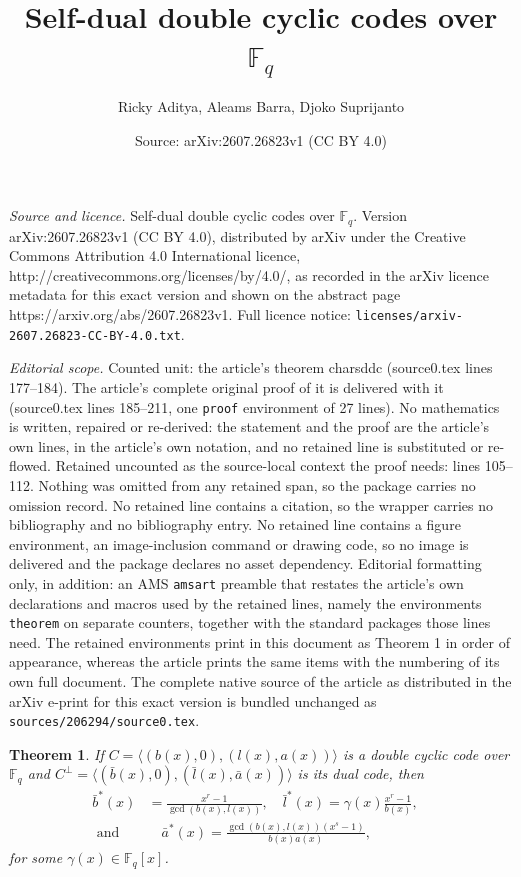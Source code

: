 \documentclass[10pt,a4paper]{amsart}
\title{Self-dual double cyclic codes over $\mathbb{F}_q$}
\author{Ricky Aditya, Aleams Barra, Djoko Suprijanto}
\date{Source: arXiv:2607.26823v1 (CC BY 4.0)}
\newtheorem{theorem}{Theorem}
\begin{document}
\maketitle

\noindent\emph{Source and licence.} Self-dual double cyclic codes over $\mathbb{F}_q$. Version arXiv:2607.26823v1 (CC BY 4.0), distributed by arXiv under the Creative Commons Attribution 4.0 International licence, http://creativecommons.org/licenses/by/4.0/, as recorded in the arXiv licence metadata for this exact version and shown on the abstract page https://arxiv.org/abs/2607.26823v1. Full licence notice: \texttt{licenses/arxiv-2607.26823-CC-BY-4.0.txt}.\par\smallskip

\noindent\textit{Editorial scope.} Counted unit: the article's theorem charsddc (source0.tex lines 177--184). The article's complete original proof of it is delivered with it (source0.tex lines 185--211, one \texttt{proof} environment of 27 lines). No mathematics is written, repaired or re-derived: the statement and the proof are the article's own lines, in the article's own notation, and no retained line is substituted or re-flowed.  Retained uncounted as the source-local context the proof needs: lines 105--112.  Nothing was omitted from any retained span, so the package carries no omission record.  No retained line contains a citation, so the wrapper carries no bibliography and no bibliography entry.  No retained line contains a figure environment, an image-inclusion command or drawing code, so no image is delivered and the package declares no asset dependency.  Editorial formatting only, in addition: an AMS \texttt{amsart} preamble that restates the article's own declarations and macros used by the retained lines, namely the environments \texttt{theorem} on separate counters, together with the standard packages those lines need.  The retained environments print in this document as Theorem 1 in order of appearance, whereas the article prints the same items with the numbering of its own full document.  The complete native source of the article as distributed in the arXiv e-print for this exact version is bundled unchanged as \texttt{sources/206294/source0.tex}.
	\begin{theorem}\label{gendual}
		If $C=\langle(b(x),0),(l(x),a(x))\rangle$ is a double cyclic code over $\mathbb{F}_q$ and $C^{\perp}=\langle(\bar{b}(x),0),(\bar{l}(x),\bar{a}(x))\rangle$ is its dual code, then
		\begin{align*}
			\bar{b}^{*}(x)&=\frac{x^r-1}{\gcd(b(x),l(x))}, \quad\bar{l}^{*}(x)=\gamma(x)\frac{x^r-1}{b(x)}, \\
			\text{ and }&\quad\bar{a}^{*}(x)=\frac{\gcd(b(x),l(x))(x^s-1)}{b(x) a(x)},&
		\end{align*}
		for some $\gamma(x)\in\mathbb{F}_q[x]$.
	\end{theorem}
\end{document}
